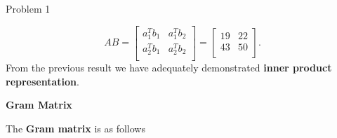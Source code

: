 \begin{problem}{Problem 1}
\begin{Highlight}[Solution]
        \begin{equation*}
            AB = 
            \begin{bmatrix}
                a_{1}^{T}b_{1} & a_{1}^{T}b_{2} \\
                a_{2}^{T}b_{1} & a_{2}^{T}b_{2} \\
            \end{bmatrix}
            = 
            \begin{bmatrix}
                19 & 22 \\
                43 & 50 \\
            \end{bmatrix}.
        \end{equation*}
        From the previous result we have adequately demonstrated \textbf{inner product representation}. \vspace*{1em}

        \noindent \textbf{Gram Matrix} \vspace*{1em}

        The \textbf{Gram matrix} is as follows


\end{Highlight}
\end{problem}
